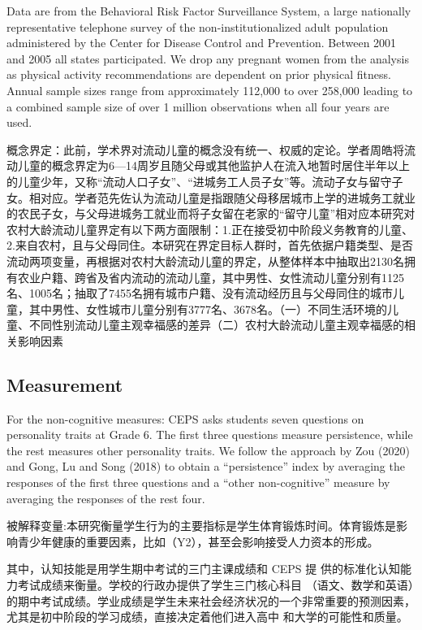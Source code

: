 Data are from the Behavioral Risk Factor Surveillance System, a large nationally representative telephone survey of the non-institutionalized adult population administered by the Center for Disease Control and Prevention. Between 2001 and 2005 all states participated. We drop any pregnant women from the analysis as physical activity recommendations are dependent on prior physical fitness. Annual sample sizes range from approximately 112,000 to over 258,000 leading to a combined sample size of over 1 million observations when all four years are used.

概念界定：此前，学术界对流动儿童的概念没有统一、权威的定论。学者周皓将流动儿童的概念界定为6—14周岁且随父母或其他监护人在流入地暂时居住半年以上的儿童少年，又称“流动人口子女”、“进城务工人员子女”等。流动子女与留守子女。相对应。学者范先佐认为流动儿童是指跟随父母移居城市上学的进城务工就业的农民子女，与父母进城务工就业而将子女留在老家的“留守儿童”相对应本研究对农村大龄流动儿童界定有以下两方面限制：1.正在接受初中阶段义务教育的儿童、2.来自农村，且与父母同住。本研究在界定目标人群时，首先依据户籍类型、是否流动两项变量，再根据对农村大龄流动儿童的界定，从整体样本中抽取出2130名拥有农业户籍、跨省及省内流动的流动儿童，其中男性、女性流动儿童分别有1125名、1005名；抽取了7455名拥有城市户籍、没有流动经历且与父母同住的城市儿童，其中男性、女性城市儿童分别有3777名、3678名。（一）不同生活环境的儿童、不同性别流动儿童主观幸福感的差异（二）农村大龄流动儿童主观幸福感的相关影响因素

\subsection{Measurement}

For the non-cognitive measures: CEPS asks students seven questions on personality traits at Grade 6. The first three questions measure persistence, while the rest measures other personality traits. We follow the approach by Zou (2020) and Gong, Lu and Song (2018) to obtain a “persistence” index by averaging the responses of the first three questions and a “other non-cognitive” measure by averaging the responses of the rest four.

被解释变量:本研究衡量学生行为的主要指标是学生体育锻炼时间。体育锻炼是影响青少年健康的重要因素，比如（Y2），甚至会影响接受人力资本的形成。

其中，认知技能是用学生期中考试的三门主课成绩和 CEPS 提 供的标准化认知能力考试成绩来衡量。学校的行政办提供了学生三门核心科目 （语文、数学和英语）的期中考试成绩。学业成绩是学生未来社会经济状况的一个非常重要的预测因素，尤其是初中阶段的学习成绩，直接决定着他们进入高中 和大学的可能性和质量。

